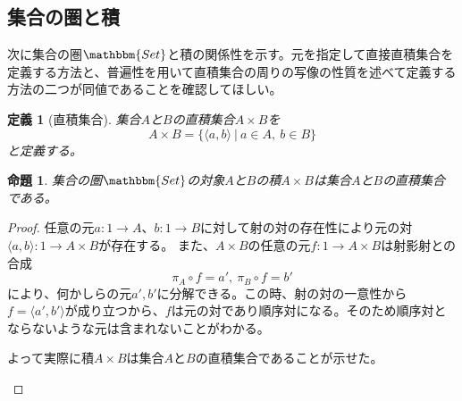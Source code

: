 \documentclass[dvipdfmx]{jsarticle}
\newcommand{\cat}[1]{\mathbbm{#1}}
\newcommand{\arrow}{\rightarrow}
\newcommand{\tuple}[1]{\langle #1\rangle}
\newcommand{\mor}[3]{#1:#2\arrow #3}
\newtheorem{proof}{証明}[section]
\newtheorem{prop}{命題}[section]
\newtheorem{define}{定義}[section]
\numberwithin{proof}{subsection}
\numberwithin{prop}{subsection}
\numberwithin{define}{subsection}
\begin{document}
	\subsection{集合の圏と積}
	次に集合の圏$\cat{Set}$と積の関係性を示す。元を指定して直接直積集合を定義する方法と、普遍性を用いて直積集合の周りの写像の性質を述べて定義する方法の二つが同値であることを確認してほしい。
	\begin{define}[直積集合]
		集合$A$と$B$の直積集合$A\times B$を\[A\times B =\{\tuple{a,b}\ |\ a\in A,\ b\in B\}\]と定義する。
	\end{define}
	\begin{prop}
		集合の圏$\cat{Set}$の対象$A$と$B$の積$A\times B$は集合$A$と$B$の直積集合である。
	\end{prop}
	\begin{proof}
		任意の元$\mor{a}{1}{A}$、$\mor{b}{1}{B}$に対して射の対の存在性により元の対$\mor{\tuple{a,b}}{1}{A\times B}$が存在する。
		また、$A\times B$の任意の元$\mor{f}{1}{A\times B}$は射影射との合成\[\pi_A\circ f=a',\ \pi_B\circ f=b'\]により、何かしらの元$a',b'$に分解できる。この時、射の対の一意性から$f=\tuple{a',b'}$が成り立つから、$f$は元の対であり順序対になる。そのため順序対とならないような元は含まれないことがわかる。

		よって実際に積$A\times B$は集合$A$と$B$の直積集合であることが示せた。
		\begin{center}
		\end{center}
	\end{proof}
\end{document}
